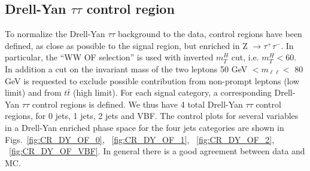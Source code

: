 \newpage
\subsection*{Drell-Yan $\tau\tau$ control region}
To normalize the Drell-Yan $\tau\tau$ background to the data, control regions
have been defined, as close as possible to the signal region, but enriched in
Z $\rightarrow \tau^+ \tau^-$. In particular, the ``WW OF selection'' is used with
inverted $m_T^H$ cut, i.e. $m_T^H<60$. In addition a cut on the invariant mass
of the two leptons 50 GeV $< m_{\ell \ell} <$ 80 GeV is requested to exclude
possible contribution from non-prompt leptons (low limit) and from  $t \bar{t}$ (high
limit).
For each signal category, a corresponding Drell-Yan $\tau\tau$ control
regions is defined. We thus have 4 total  Drell-Yan $\tau\tau$ control
regions, for 0 jets, 1 jets, 2 jets and VBF.
The control plots for several variables in a Drell-Yan enriched phase space
for the four jets categories are shown in Figs.~\ref{fig:CR_DY_OF_0},
~\ref{fig:CR_DY_OF_1}, ~\ref{fig:CR_DY_OF_2}, ~\ref{fig:CR_DY_OF_VBF}.
In general there is a good agreement between data and MC.\\
